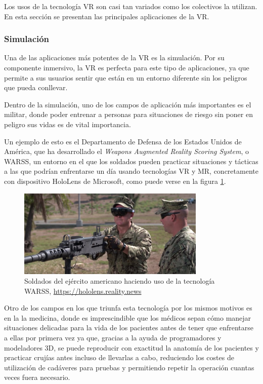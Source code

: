 Los usos de la tecnología \acs{VR} son casi tan variados como los colectivos la utilizan. En esta sección se presentan las principales aplicaciones de la \acs{VR}.

\subsubsection{Simulación}

Una de las aplicaciones más potentes de la \acs{VR} es la simulación. Por su componente inmersivo, la \acs{VR} es perfecta para este tipo de aplicaciones, ya que permite a sus usuarios sentir que están en un entorno diferente sin los peligros que pueda conllevar.

Dentro de la simulación, uno de los campos de aplicación más importantes es el militar, donde poder entrenar a personas para situaciones de riesgo sin poner en peligro sus vidas es de vital importancia.

Un ejemplo de esto es el Departamento de Defensa de los Estados Unidos de América, que ha desarrollado el \textit{Weapons Augmented Reality Scoring System}, o WARSS, un entorno en el que los soldados pueden practicar situaciones y tácticas a las que podrían enfrentarse un día usando tecnologías \acs{VR} y \acs{MR}, concretamente con dispositivo HoloLens de Microsoft, como puede verse en la figura \ref{fig:warss}.

\begin{figure}[!h]
\begin{center}
\includegraphics[width=0.8\textwidth]{imagenes/2/WARSS.jpg}
\caption{Soldados del ejército americano haciendo uso de la tecnología WARSS, \url{https://hololens.reality.news}}
\label{fig:warss}
\end{center}
\end{figure}

Otro de los campos en los que triunfa esta tecnología por los mismos motivos es en la la medicina, donde es imprescindible que los médicos sepan cómo manejar situaciones delicadas para la vida de los pacientes antes de tener que enfrentarse a ellas por primera vez ya que, gracias a la ayuda de programadores y modeladores 3D, se puede reproducir con exactitud la anatomía de los pacientes y practicar crujías antes incluso de llevarlas a cabo, reduciendo los costes de utilización de cadáveres para pruebas y permitiendo repetir la operación cuantas veces fuera necesario.

